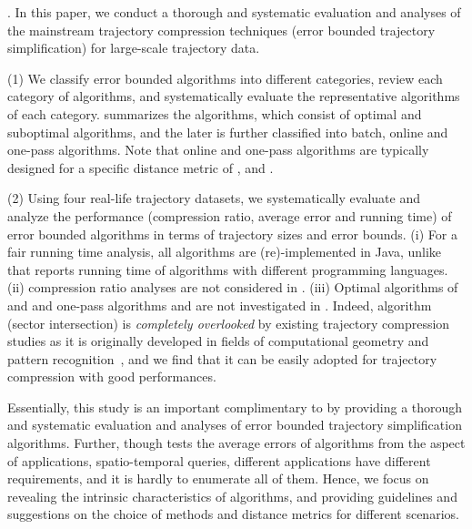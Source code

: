 




.
In this paper, we conduct a thorough and systematic evaluation and analyses of the mainstream trajectory compression techniques (\ie error bounded trajectory simplification) for large-scale trajectory data.

\stab (1) We classify error bounded \lsa algorithms into different categories, review each category of algorithms, and systematically evaluate the representative algorithms of each category.
%
 summarizes the algorithms, which consist of optimal and suboptimal algorithms, and the later is further classified into batch, online and one-pass algorithms.
Note that online and one-pass algorithms are typically designed for a specific distance metric of \ped, \sed and \dad.

\stab (2) Using four real-life trajectory datasets, we systematically evaluate and analyze the performance (compression ratio, average error and running
time) of error bounded \lsa algorithms in terms of trajectory sizes and error bounds.
%
(i) For a fair running time analysis, all algorithms are (re)-implemented in Java, unlike \cite{Zhang:Evaluation} that reports running time of algorithms with different programming languages. (ii) compression ratio analyses are not considered in \cite{Zhang:Evaluation}. (iii) Optimal algorithms of \ped and \sed and one-pass algorithms \siped and \cised are not investigated in \cite{Zhang:Evaluation}. Indeed, algorithm \siped (sector intersection) is {\em completely overlooked} by existing trajectory compression studies as it is originally developed in fields of computational geometry and pattern recognition~\cite{Williams:Longest,Sklansky:Cone,Dunham:Cone, Zhao:Sleeve}, and we find that it can be easily adopted for trajectory compression with good performances.


Essentially, this study is an important complimentary to \cite{Zhang:Evaluation} by providing a thorough and systematic evaluation and analyses of error bounded trajectory simplification algorithms. Further, though  \cite{Zhang:Evaluation} tests the average errors of algorithms from the aspect of applications, \ie spatio-temporal queries, different applications have different requirements, and it is hardly to enumerate all of them. Hence, we focus on revealing the intrinsic characteristics of algorithms, and providing guidelines and suggestions on the choice of methods and distance metrics for different scenarios.





